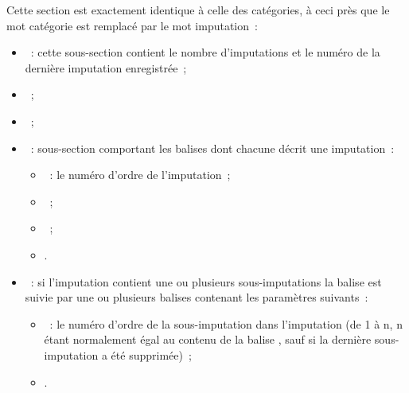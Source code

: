 Cette section est exactement identique à celle des catégories, à ceci près que le 
mot catégorie est remplacé par le mot imputation~:

\begin{itemize}

\item {}~: cette sous-section contient le nombre 
d'imputations et le numéro de la dernière imputation enregistrée~;

\item {}~;

\item {}~;

\item {}~: sous-section comportant 
les balises  dont chacune décrit une imputation~:

\begin{itemize}

\item {}~: le numéro d'ordre de l'imputation~;

\item {}~;

\item {}~;

\item {}.

\end{itemize}

\item {}~: si l'imputation contient une ou 
plusieurs sous-imputations la balise  est suivie par une ou
plusieurs balises  contenant les paramètres suivants~:
\begin{itemize}

\item {}~: le numéro d'ordre de la sous-imputation dans l'imputation (de
1 à n, n étant normalement égal au contenu de la balise 
, sauf si la dernière sous-imputation a 
été supprimée)~;

\item {}.

\end{itemize}

\end{itemize}

